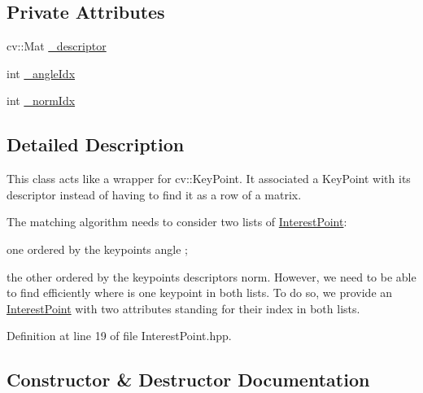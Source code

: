 \subsection*{Private Attributes}
\begin{DoxyCompactItemize}
\item 
cv\+::\+Mat \hyperlink{classdefals_1_1_interest_point_aaa341f5d37a05dcf8f53124a07274497}{\+\_\+descriptor}
\item 
int \hyperlink{classdefals_1_1_interest_point_a635589d58f12cab7408e4068f6cf5828}{\+\_\+angle\+Idx}
\item 
int \hyperlink{classdefals_1_1_interest_point_a8e6671d9215b3a767479ec6e11bdb1d2}{\+\_\+norm\+Idx}
\end{DoxyCompactItemize}


\subsection{Detailed Description}
This class acts like a wrapper for cv\+::\+Key\+Point. It associated a Key\+Point with its descriptor instead of having to find it as a row of a matrix.

The matching algorithm needs to consider two lists of \hyperlink{classdefals_1_1_interest_point}{Interest\+Point}\+:
\begin{DoxyItemize}
\item one ordered by the keypoint\textquotesingle{}s angle ;
\item the other ordered by the keypoint\textquotesingle{}s descriptor\textquotesingle{}s norm. However, we need to be able to find efficiently where is one keypoint in both lists. To do so, we provide an \hyperlink{classdefals_1_1_interest_point}{Interest\+Point} with two attributes standing for their index in both lists. 
\end{DoxyItemize}

Definition at line 19 of file Interest\+Point.\+hpp.



\subsection{Constructor \& Destructor Documentation}
\mbox{\label{classdefals_1_1_interest_point_a1b6bd2869b17262d6ff88ce9af43d9fd}} 
